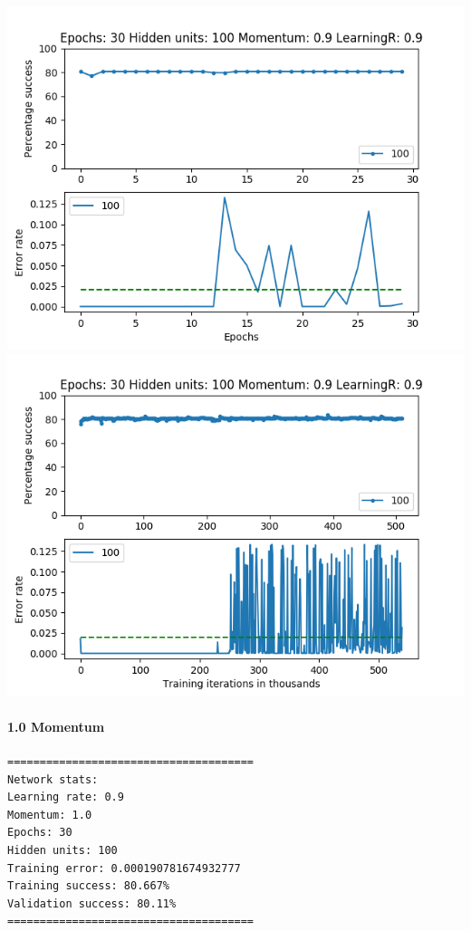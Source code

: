 \documentclass[11pt]{article}
\makeatletter
\def\maxwidth{\ifdim\Gin@nat@width>\linewidth\linewidth
    \else\Gin@nat@width\fi}
\let\Oldincludegraphics\includegraphics
\renewcommand{\includegraphics}[1]{\Oldincludegraphics[width=.8\maxwidth]{#1}}
\makeatother
\begin{document}
\includegraphics{Experiment2/E2_NN_Epoch_Momentum_0.9_30Epochs_100Hiddenunits.png}
\includegraphics{Experiment2/E2_NN_Training_Momentum_0.9_30Epochs_100Hiddenunits.png}

\hypertarget{momentum-10}{%
\paragraph{1.0 Momentum}\label{momentum-10}}

\begin{verbatim}
======================================
Network stats: 
Learning rate: 0.9
Momentum: 1.0
Epochs: 30
Hidden units: 100
Training error: 0.000190781674932777
Training success: 80.667%
Validation success: 80.11%
======================================
\end{verbatim}
\end{document}
